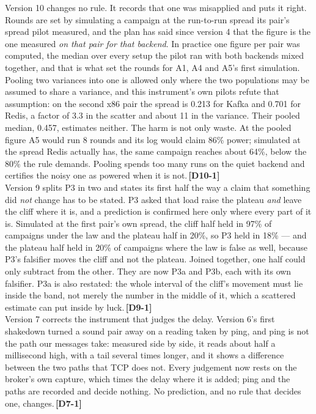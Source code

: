 \documentclass[11pt]{article}
\newcommand{\chgold}[1]{\,{\color{oldcol}\bfseries\footnotesize[#1]}}
\begin{document}
{Version 10 changes no rule. It records that one was misapplied and puts it right. Rounds are set by simulating a campaign at the run-to-run spread its pair's spread pilot measured, and the plan has said since version 4 that the figure is the one measured \emph{on that pair for that backend}. In practice one figure per pair was computed, the median over every setup the pilot ran with both backends mixed together, and that is what set the rounds for A1, A4 and A5's first simulation. Pooling two variances into one is allowed only where the two populations may be assumed to share a variance, and this instrument's own pilots refute that assumption: on the second x86 pair the spread is 0.213 for Kafka and 0.701 for Redis, a factor of 3.3 in the scatter and about 11 in the variance. Their pooled median, 0.457, estimates neither. The harm is not only waste. At the pooled figure A5 would run 8 rounds and its log would claim 86\% power; simulated at the spread Redis actually has, the same campaign reaches about 64\%, below the 80\% the rule demands. Pooling spends too many runs on the quiet backend and certifies the noisy one as powered when it is not.\chgold{D10-1}\\[3pt]
Version 9 splits P3 in two and states its first half the way a claim that something did \emph{not} change has to be stated. P3 asked that load raise the plateau \emph{and} leave the cliff where it is, and a prediction is confirmed here only where every part of it is. Simulated at the first pair's own spread, the cliff half held in 97\% of campaigns under the law and the plateau half in 20\%, so P3 held in 18\% --- and the plateau half held in 20\% of campaigns where the law is false as well, because P3's falsifier moves the cliff and not the plateau. Joined together, one half could only subtract from the other. They are now P3a and P3b, each with its own falsifier. P3a is also restated: the whole interval of the cliff's movement must lie inside the band, not merely the number in the middle of it, which a scattered estimate can put inside by luck.\chgold{D9-1}\\[3pt]
Version 7 corrects the instrument that judges the delay. Version 6's first shakedown turned a sound pair away on a reading taken by ping, and ping is not the path our messages take: measured side by side, it reads about half a millisecond high, with a tail several times longer, and it shows a difference between the two paths that TCP does not. Every judgement now rests on the broker's own capture, which times the delay where it is added; ping and the paths are recorded and decide nothing. No prediction, and no rule that decides one, changes.\chgold{D7-1}}
\end{document}

